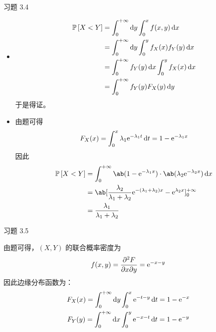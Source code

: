 \begin{problem}
    习题 3.4
    \begin{solution}
        \begin{itemize}
            \item[\textbf{1)}]
            $$
            \begin{aligned}
                \operatorname{\mathbb{P}}\left[X < Y\right] & = \int_{0}^{+ \infty} \dd{y} \int_{0}^{x} f(x, y) \dd{x} \\
                & = \int_{0}^{+ \infty} \dd{y} \int_{0}^{y} f_X(x) f_Y(y) \dd{x} \\
                & = \int_{0}^{+ \infty} f_Y(y) \dd{x} \int_{0}^{y} f_X(x) \dd{x} \\
                & = \int_{0}^{+ \infty} f_Y(y) F_X(y) \dd{y}
            \end{aligned}
            $$
            于是得证。
    
            \item[\textbf{2)}] 由题可得
            $$
            F_X(x) = \int_{0}^{x} \lambda_1 \mathrm{e}^{-\lambda_1 t} \dd{t} = 1 - \mathrm{e}^{-\lambda_1 x}
            $$
            因此
            $$
            \begin{aligned}
                \prob{X < Y} & = \int_{0}^{+ \infty} \ab(1 - \E^{-\lambda_1 x}) \cdot \ab(\lambda_2 \E^{-\lambda_2 x}) \dd{x} \\
                & = \ab[\frac{\lambda_2}{\lambda_1 + \lambda_2} \E^{-(\lambda_1 + \lambda_2) x} - \E^{\lambda_2 x}]_{0}^{+ \infty} \\
                & = \frac{\lambda_1}{\lambda_1 + \lambda_2}
            \end{aligned}
            $$
        \end{itemize}
    \end{solution}
\end{problem}

\begin{problem}
    习题 3.5
    \begin{solution}
        由题可得，$(X, Y)$ 的联合概率密度为
        $$
        f(x, y) = \pdv[2]{F}{x}{y} = \mathrm{e}^{-x - y}
        $$
        因此边缘分布函数为：
        $$
        \begin{gathered}
            F_X(x) = \int_{0}^{+ \infty} \dd{y} \int_{0}^{x} \mathrm{e}^{-t - y} \dd{t} = 1 - \mathrm{e}^{-x} \\
            F_Y(y) = \int_{0}^{+ \infty} \dd{x} \int_{0}^{y} \mathrm{e}^{-x - t} \dd{t} = 1 - \mathrm{e}^{-y} \\
        \end{gathered}
        $$
    \end{solution}
\end{problem}


